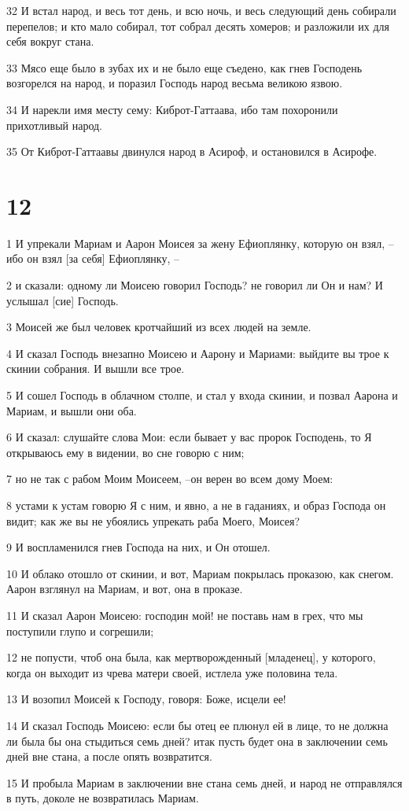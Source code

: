 \par 32 И встал народ, и весь тот день, и всю ночь, и весь следующий день собирали перепелов; и кто мало собирал, тот собрал десять хомеров; и разложили их для себя вокруг стана.
\par 33 Мясо еще было в зубах их и не было еще съедено, как гнев Господень возгорелся на народ, и поразил Господь народ весьма великою язвою.
\par 34 И нарекли имя месту сему: Киброт-Гаттаава, ибо там похоронили прихотливый народ.
\par 35 От Киброт-Гаттаавы двинулся народ в Асироф, и остановился в Асирофе.

\chapter{12}

\par 1 И упрекали Мариам и Аарон Моисея за жену Ефиоплянку, которую он взял, --ибо он взял [за себя] Ефиоплянку, --
\par 2 и сказали: одному ли Моисею говорил Господь? не говорил ли Он и нам? И услышал [сие] Господь.
\par 3 Моисей же был человек кротчайший из всех людей на земле.
\par 4 И сказал Господь внезапно Моисею и Аарону и Мариами: выйдите вы трое к скинии собрания. И вышли все трое.
\par 5 И сошел Господь в облачном столпе, и стал у входа скинии, и позвал Аарона и Мариам, и вышли они оба.
\par 6 И сказал: слушайте слова Мои: если бывает у вас пророк Господень, то Я открываюсь ему в видении, во сне говорю с ним;
\par 7 но не так с рабом Моим Моисеем, --он верен во всем дому Моем:
\par 8 устами к устам говорю Я с ним, и явно, а не в гаданиях, и образ Господа он видит; как же вы не убоялись упрекать раба Моего, Моисея?
\par 9 И воспламенился гнев Господа на них, и Он отошел.
\par 10 И облако отошло от скинии, и вот, Мариам покрылась проказою, как снегом. Аарон взглянул на Мариам, и вот, она в проказе.
\par 11 И сказал Аарон Моисею: господин мой! не поставь нам в грех, что мы поступили глупо и согрешили;
\par 12 не попусти, чтоб она была, как мертворожденный [младенец], у которого, когда он выходит из чрева матери своей, истлела уже половина тела.
\par 13 И возопил Моисей к Господу, говоря: Боже, исцели ее!
\par 14 И сказал Господь Моисею: если бы отец ее плюнул ей в лице, то не должна ли была бы она стыдиться семь дней? итак пусть будет она в заключении семь дней вне стана, а после опять возвратится.
\par 15 И пробыла Мариам в заключении вне стана семь дней, и народ не отправлялся в путь, доколе не возвратилась Мариам.


